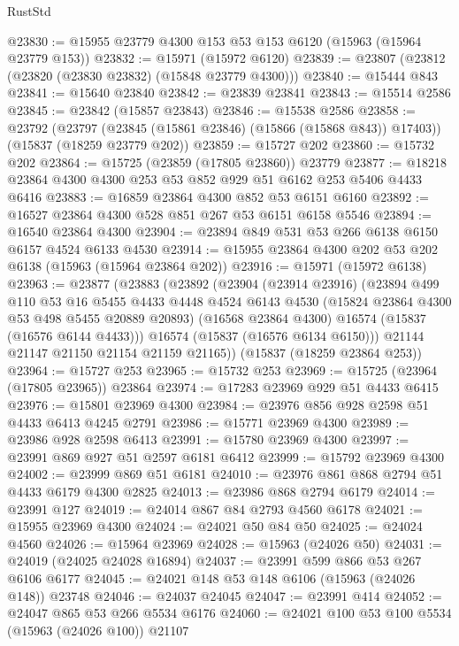 \begin{lexlean}{RustStd}
\begin{coremodule}
@23830 := @15955 @23779 @4300 @153 @53 @153 @6120 (@15963 (@15964 @23779 @153))
@23832 := @15971 (@15972 @6120)
@23839 := @23807 (@23812 (@23820 (@23830 @23832) (@15848 @23779 @4300)))
@23840 := @15444 @843
@23841 := @15640 @23840
@23842 := @23839 @23841
@23843 := @15514 @2586
@23845 := @23842 (@15857 @23843)
@23846 := @15538 @2586
@23858 := @23792
    (@23797 (@23845 (@15861 @23846) (@15866 (@15868 @843)) @17403))
    (@15837 (@18259 @23779 @202))
@23859 := @15727 @202
@23860 := @15732 @202
@23864 := @15725 (@23859 (@17805 @23860)) @23779
@23877 := @18218 @23864 @4300 @4300 @253 @53 @852 @929 @51 @6162 @253 @5406 @4433 @6416
@23883 := @16859 @23864 @4300 @852 @53 @6151 @6160
@23892 := @16527 @23864 @4300 @528 @851 @267 @53 @6151 @6158 @5546
@23894 := @16540 @23864 @4300
@23904 := @23894 @849 @531 @53 @266 @6138 @6150 @6157 @4524 @6133 @4530
@23914 := @15955 @23864 @4300 @202 @53 @202 @6138 (@15963 (@15964 @23864 @202))
@23916 := @15971 (@15972 @6138)
@23963 := @23877
    (@23883
      (@23892
        (@23904
          (@23914 @23916)
          (@23894
            @499
            @110
            @53
            @16
            @5455
            @4433
            @4448
            @4524
            @6143
            @4530
            (@15824 @23864 @4300 @53 @498 @5455 @20889 @20893)
            (@16568 @23864 @4300)
            @16574
            (@15837 (@16576 @6144 @4433)))
          @16574
          (@15837 (@16576 @6134 @6150)))
        @21144
        @21147
        @21150
        @21154
        @21159
        @21165))
    (@15837 (@18259 @23864 @253))
@23964 := @15727 @253
@23965 := @15732 @253
@23969 := @15725 (@23964 (@17805 @23965)) @23864
@23974 := @17283 @23969 @929 @51 @4433 @6415
@23976 := @15801 @23969 @4300
@23984 := @23976 @856 @928 @2598 @51 @4433 @6413 @4245 @2791
@23986 := @15771 @23969 @4300
@23989 := @23986 @928 @2598 @6413
@23991 := @15780 @23969 @4300
@23997 := @23991 @869 @927 @51 @2597 @6181 @6412
@23999 := @15792 @23969 @4300
@24002 := @23999 @869 @51 @6181
@24010 := @23976 @861 @868 @2794 @51 @4433 @6179 @4300 @2825
@24013 := @23986 @868 @2794 @6179
@24014 := @23991 @127
@24019 := @24014 @867 @84 @2793 @4560 @6178
@24021 := @15955 @23969 @4300
@24024 := @24021 @50 @84 @50
@24025 := @24024 @4560
@24026 := @15964 @23969
@24028 := @15963 (@24026 @50)
@24031 := @24019 (@24025 @24028 @16894)
@24037 := @23991 @599 @866 @53 @267 @6106 @6177
@24045 := @24021 @148 @53 @148 @6106 (@15963 (@24026 @148)) @23748
@24046 := @24037 @24045
@24047 := @23991 @414
@24052 := @24047 @865 @53 @266 @5534 @6176
@24060 := @24021 @100 @53 @100 @5534 (@15963 (@24026 @100)) @21107

\end{coremodule}
\end{lexlean}
